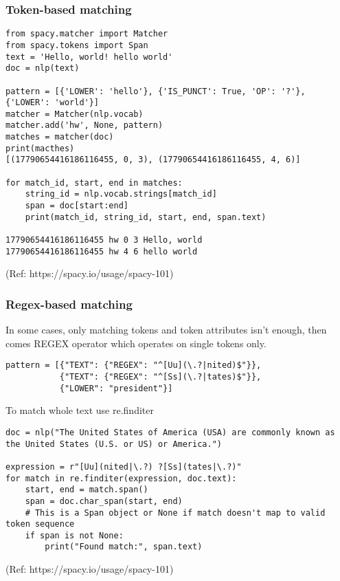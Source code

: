 \begin{frame}[fragile]\frametitle{Token-based matching }

\begin{lstlisting}
from spacy.matcher import Matcher
from spacy.tokens import Span
text = 'Hello, world! hello world'
doc = nlp(text)

pattern = [{'LOWER': 'hello'}, {'IS_PUNCT': True, 'OP': '?'}, {'LOWER': 'world'}]
matcher = Matcher(nlp.vocab)
matcher.add('hw', None, pattern)
matches = matcher(doc)
print(macthes)
[(17790654416186116455, 0, 3), (17790654416186116455, 4, 6)]

for match_id, start, end in matches:
    string_id = nlp.vocab.strings[match_id]
    span = doc[start:end]
    print(match_id, string_id, start, end, span.text)
		
17790654416186116455 hw 0 3 Hello, world
17790654416186116455 hw 4 6 hello world		
\end{lstlisting}
	
{\tiny (Ref: https://spacy.io/usage/spacy-101)}
\end{frame}

\begin{frame}[fragile]\frametitle{Regex-based matching }

In some cases, only matching tokens and token attributes isn’t enough, then comes REGEX operator which  operates on single tokens only. 

\begin{lstlisting}
pattern = [{"TEXT": {"REGEX": "^[Uu](\.?|nited)$"}},
           {"TEXT": {"REGEX": "^[Ss](\.?|tates)$"}},
           {"LOWER": "president"}]
\end{lstlisting}
	
	To match whole text use re.finditer
	
	\begin{lstlisting}
doc = nlp("The United States of America (USA) are commonly known as the United States (U.S. or US) or America.")

expression = r"[Uu](nited|\.?) ?[Ss](tates|\.?)"
for match in re.finditer(expression, doc.text):
    start, end = match.span()
    span = doc.char_span(start, end)
    # This is a Span object or None if match doesn't map to valid token sequence
    if span is not None:
        print("Found match:", span.text)
\end{lstlisting}

{\tiny (Ref: https://spacy.io/usage/spacy-101)}
\end{frame}


